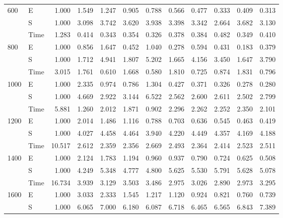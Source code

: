 \begin{table}[H]
\begin{tabular}{|l|l|rrrrrrrrrr|}
        \cline{1-12}
        \multirow[t]{3}{*}{600}  & E    & 1.000  & 1.549 & 1.247 & 0.905 & 0.788 & 0.566 & 0.477 & 0.333 & 0.409 & 0.313 \\
        & S    & 1.000  & 3.098 & 3.742 & 3.620 & 3.938 & 3.398 & 3.342 & 2.664 & 3.682 & 3.130 \\
        & Time & 1.283  & 0.414 & 0.343 & 0.354 & 0.326 & 0.378 & 0.384 & 0.482 & 0.349 & 0.410 \\
        \cline{1-12}
        \multirow[t]{3}{*}{800}  & E    & 1.000  & 0.856 & 1.647 & 0.452 & 1.040 & 0.278 & 0.594 & 0.431 & 0.183 & 0.379 \\
        & S    & 1.000  & 1.712 & 4.941 & 1.807 & 5.202 & 1.665 & 4.156 & 3.450 & 1.647 & 3.790 \\
        & Time & 3.015  & 1.761 & 0.610 & 1.668 & 0.580 & 1.810 & 0.725 & 0.874 & 1.831 & 0.796 \\
        \cline{1-12}
        \multirow[t]{3}{*}{1000} & E    & 1.000  & 2.335 & 0.974 & 0.786 & 1.304 & 0.427 & 0.371 & 0.326 & 0.278 & 0.280 \\
        & S    & 1.000  & 4.669 & 2.922 & 3.144 & 6.522 & 2.562 & 2.600 & 2.611 & 2.502 & 2.799 \\
        & Time & 5.881  & 1.260 & 2.012 & 1.871 & 0.902 & 2.296 & 2.262 & 2.252 & 2.350 & 2.101 \\
        \cline{1-12}
        \multirow[t]{3}{*}{1200} & E    & 1.000  & 2.014 & 1.486 & 1.116 & 0.788 & 0.703 & 0.636 & 0.545 & 0.463 & 0.419 \\
        & S    & 1.000  & 4.027 & 4.458 & 4.464 & 3.940 & 4.220 & 4.449 & 4.357 & 4.169 & 4.188 \\
        & Time & 10.517 & 2.612 & 2.359 & 2.356 & 2.669 & 2.493 & 2.364 & 2.414 & 2.523 & 2.511 \\
        \cline{1-12}
        \multirow[t]{3}{*}{1400} & E    & 1.000  & 2.124 & 1.783 & 1.194 & 0.960 & 0.937 & 0.790 & 0.724 & 0.625 & 0.508 \\
        & S    & 1.000  & 4.249 & 5.348 & 4.777 & 4.800 & 5.625 & 5.530 & 5.791 & 5.628 & 5.078 \\
        & Time & 16.734 & 3.939 & 3.129 & 3.503 & 3.486 & 2.975 & 3.026 & 2.890 & 2.973 & 3.295 \\
        \cline{1-12}
        \multirow[t]{3}{*}{1600} & E    & 1.000  & 3.033 & 2.333 & 1.545 & 1.217 & 1.120 & 0.924 & 0.821 & 0.760 & 0.739 \\
        & S    & 1.000  & 6.065 & 7.000 & 6.180 & 6.087 & 6.718 & 6.465 & 6.565 & 6.843 & 7.389 \\

\end{tabular}
\end{table}
